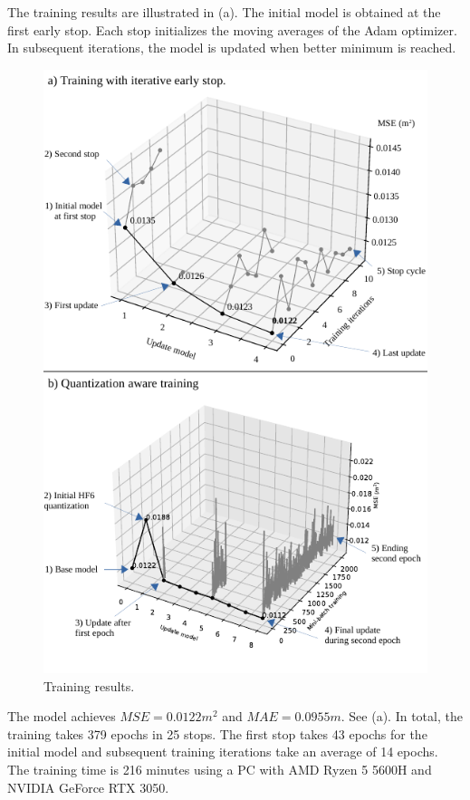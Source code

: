 The training results are illustrated in (a). The initial model is obtained at the first early stop. Each stop initializes the moving averages of the Adam optimizer. In subsequent iterations, the model is updated when better minimum is reached.

\begin{figure}[t!]
	\centering
	\includegraphics[width=\columnwidth]{../figures/histograms/training_and_quantization.pdf}
	\caption{Training results.}
	\label{fig:optimization}
\end{figure}

The model achieves $MSE=0.0122m^2$ and $MAE=0.0955m$. See (a). In total, the training takes 379 epochs in 25 stops. The first stop takes 43 epochs for the initial model and subsequent training iterations take an average of 14 epochs. The training time is 216 minutes using a PC with AMD Ryzen 5 5600H and NVIDIA GeForce RTX 3050.

